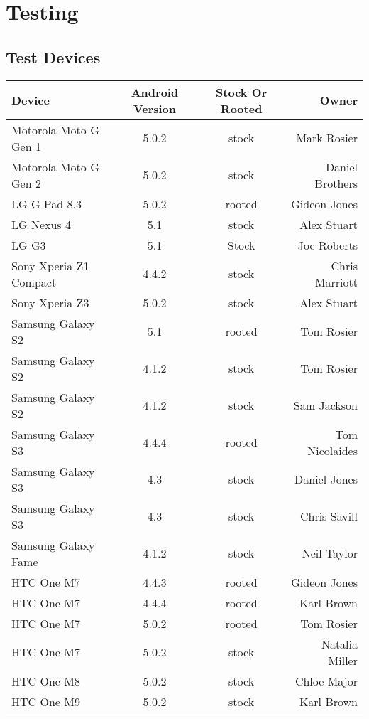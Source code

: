 \chapter{Testing}

\section{Test Devices}


\begin{tabular}{ l c c r }
\hline
Device & Android Version & Stock Or Rooted & Owner \\
\hline
Motorola Moto G Gen 1 & 5.0.2 & stock & Mark Rosier \\
Motorola Moto G Gen 2 & 5.0.2 & stock & Daniel Brothers \\ 
\hline
LG G-Pad 8.3 & 5.0.2 & rooted & Gideon Jones \\
LG Nexus 4 & 5.1 & stock & Alex Stuart \\
LG G3 & 5.1 & Stock & Joe Roberts \\
\hline
Sony Xperia Z1 Compact & 4.4.2 & stock & Chris Marriott \\ 
Sony Xperia Z3 & 5.0.2 & stock & Alex Stuart \\
\hline
Samsung Galaxy S2 & 5.1 & rooted & Tom Rosier \\
Samsung Galaxy S2 & 4.1.2 & stock & Tom Rosier \\
Samsung Galaxy S2 & 4.1.2 & stock & Sam Jackson \\
Samsung Galaxy S3 & 4.4.4 & rooted & Tom Nicolaides \\
Samsung Galaxy S3 & 4.3 & stock & Daniel Jones \\
Samsung Galaxy S3 & 4.3 & stock & Chris Savill \\
Samsung Galaxy Fame & 4.1.2 & stock & Neil Taylor \\
\hline
HTC One M7 & 4.4.3 & rooted & Gideon Jones \\
HTC One M7 & 4.4.4 & rooted & Karl Brown \\
HTC One M7 & 5.0.2 & rooted & Tom Rosier \\
HTC One M7 & 5.0.2 & stock & Natalia Miller \\
HTC One M8 & 5.0.2 & stock & Chloe Major \\
HTC One M9 & 5.0.2 & stock & Karl Brown \\
\hline
\end{tabular}